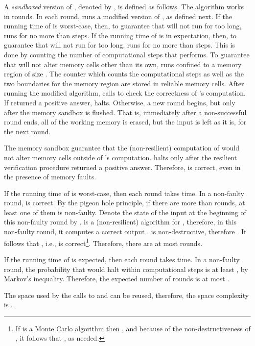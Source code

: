 \documentclass{llncs}
\begin{document}
\begin{pf}
A \emph{sandboxed} version of , denoted by , is defined as follows. The algorithm works in rounds. In each round,  runs a modified version of , as defined next. If the running time of  is worst-case, then, to guarantee that  will not run for too long,  runs  for no more than  steps. If the running time of  is in expectation, then, to guarantee that  will not run for too long,  runs  for no more than  steps. This is done by counting the number of computational steps that  performs. To guarantee that  will not alter memory cells other than its own,  runs  confined to a memory region of size . The counter which counts the computational steps as well as the two boundaries for the memory region are stored in reliable memory cells. After running the modified  algorithm,  calls  to check the correctness of 's computation. If  returned a positive answer,  halts. Otherwise, a new round begins, but only after the memory sandbox is flushed. That is, immediately after a non-successful round ends, all of the working memory is erased, but the input is left as it is, for the next round.

The memory sandbox guarantee that the (non-resilient) computation of  would not alter memory cells outside of 's computation.  halts only after the resilient verification procedure  returned a positive answer. Therefore,  is correct, even in the presence of memory faults.

If the running time of  is worst-case, then each round takes  time. In a non-faulty round,  is correct. By the pigeon hole principle, if there are more than  rounds, at least one of them is non-faulty. Denote the state of the input at the beginning of this non-faulty round by .  is a (non-resilient) algorithm for , therefore, in this non-faulty round, it computes a correct output .  is non-destructive, therefore . It follows that , i.e.,  is correct\footnote{If  is a Monte Carlo algorithm then , and because of the non-destructiveness of , it follows that , as needed.}. Therefore, there are at most  rounds.

If the running time of  is expected, then each round takes  time. In a non-faulty round, the probability that  would halt within  computational steps is at least , by Markov's inequality. Therefore, the expected number of rounds is at most .

The space used by the calls to  and  can be reused, therefore, the space complexity is .~\end{pf}
\end{document}
